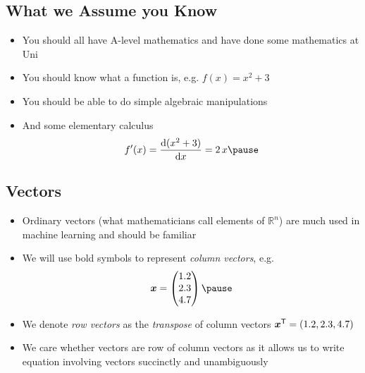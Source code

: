 \Outline %

\begin{slide}
\section{What we Assume you Know}
  
\begin{PauseHighLight}
  \begin{itemize}
  \item You should all have A-level mathematics and have done some
    mathematics at Uni\pause
  \item You should know what a function is, e.g. $f(x) = x^2+3$\pause
  \item You should be able to do simple algebraic manipulations\pause
  \item And some elementary calculus
    \begin{align*}
      f'(x) = \frac{\dd (x^2+3)}{\dd x} = 2\,x\pause
    \end{align*}
  \end{itemize}
\end{PauseHighLight}

\end{slide}


\begin{slide}
\section{Vectors}

\begin{PauseHighLight}
  \begin{itemize}
  \item Ordinary vectors (what mathematicians call elements of
    $\mathbb{R}^n$) are much used in machine learning and should be
    familiar\pause
  \item We will use bold symbols to represent \emph{column vectors}, e.g.
    \begin{align*}
      \bm{x} =
      \begin{pmatrix}
        1.2 \\ 2.3 \\ 4.7
      \end{pmatrix}\pause
    \end{align*}
  \item We denote \emph{row vectors} as the \emph{transpose} of column
    vectors $\bm{x}^{\textsf{T}} = (1.2, 2.3, 4.7)$\pause
  \item We care whether vectors are row of column vectors as it allows
    us to write equation involving vectors succinctly and unambiguously\pause
  \end{itemize}
\end{PauseHighLight}

\end{slide}

